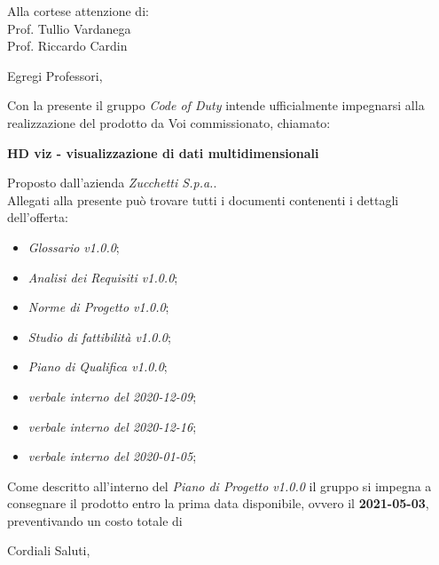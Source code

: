 \documentclass[11pt]{letter}
\begin{document}
\begin{letter}{Alla cortese attenzione di: \\ Prof. Tullio Vardanega \\ Prof. Riccardo Cardin}
\date{8 Gennaio, 2021}
\opening{Egregi Professori,}
Con la presente il gruppo \textit{Code of Duty} intende ufficialmente impegnarsi alla realizzazione del prodotto da Voi commissionato, chiamato:
\begin{center}
    \textbf{HD viz -  visualizzazione di dati multidimensionali}
\end{center}
Proposto dall'azienda \textit{Zucchetti S.p.a.}.\\
Allegati alla presente può trovare tutti i documenti contenenti i dettagli dell'offerta:
\begin{itemize}
    \item \textit{Glossario v1.0.0};
    \item \textit{Analisi dei Requisiti v1.0.0};
    \item \textit{Norme di Progetto v1.0.0};
    \item \textit{Studio di fattibilità v1.0.0};
    \item \textit{Piano di Qualifica v1.0.0};
    \item \textit{verbale interno del 2020-12-09};
    \item \textit{verbale interno del 2020-12-16};
    \item \textit{verbale interno del 2020-01-05};
\end{itemize}
Come descritto all'interno del \textit{Piano di Progetto v1.0.0} il gruppo si impegna a consegnare il prodotto entro la prima data disponibile, ovvero il \textbf{2021-05-03}, preventivando un costo totale di \textbf{}
\closing{Cordiali Saluti,}
\end{letter}
\end{document}
